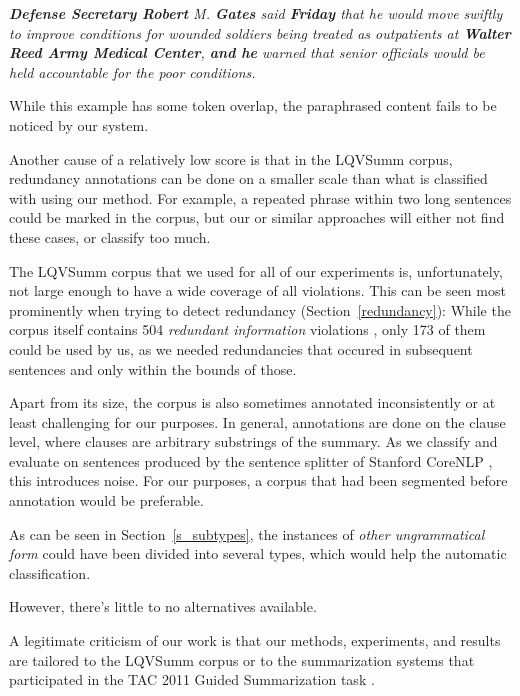 \documentclass[a4paper,10pt]{scrartcl}
\theoremstyle{style}
\begin{document}
\quad\textit{\textbf{Defense Secretary Robert} M. \textbf{Gates} said \textbf{Friday} that he would move swiftly to improve conditions for wounded soldiers being treated as outpatients at \textbf{Walter Reed Army Medical Center}, \textbf{and he} warned that senior officials would be held accountable for the poor conditions.}

While this example has some token overlap, the paraphrased content fails to be noticed by our system.

Another cause of a relatively low score is that in the LQVSumm corpus, redundancy annotations can be done on a smaller scale than what is classified with using our method. For example, a repeated phrase within two long sentences could be marked in the corpus, but our or similar approaches will either not find these cases, or classify too much.

The LQVSumm corpus that we used for all of our experiments is, unfortunately, not large enough to have a wide coverage of all violations. This can be seen most prominently when trying to detect redundancy (Section~\ref{redundancy}): While the corpus itself contains 504 \textit{redundant information} violations \citep[see][]{friedrichlqvsumm}, only 173 of them could be used by us, as we needed redundancies that occured in subsequent sentences and only within the bounds of those.

Apart from its size, the corpus is also sometimes annotated inconsistently or at least challenging for our purposes. In general, annotations are done on the clause level, where clauses are arbitrary substrings of the summary. As we classify and evaluate on sentences produced by the sentence splitter of Stanford CoreNLP \citep{manning-EtAl:2014:P14-5}, this introduces noise. For our purposes, a corpus that had been segmented before annotation would be preferable.

As can be seen in Section~\ref{s_subtypes}, the instances of \textit{other ungrammatical form} could have been divided into several types, which would help the automatic classification.

However, there's little to no alternatives available.

A legitimate criticism of our work is that our methods, experiments, and results are tailored to the LQVSumm corpus or to the summarization systems that participated in the TAC 2011 Guided Summarization task \citep{owczarzak2011overview}.

\end{document}
